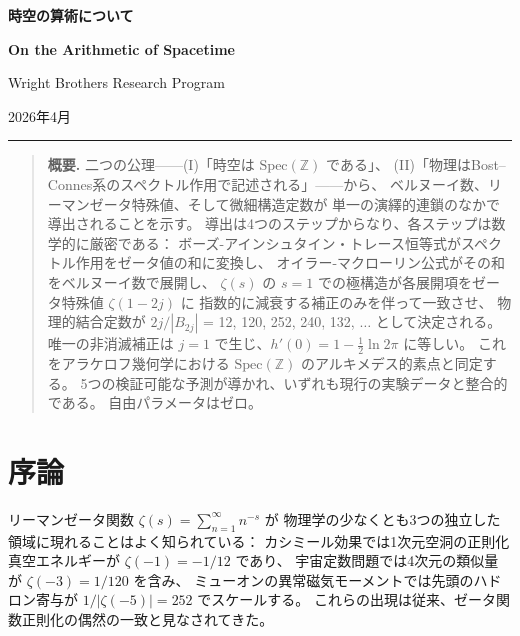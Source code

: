 \documentclass[11pt,a4paper]{article}
\newcommand{\Spec}{\mathrm{Spec}}
\begin{document}
\begin{center}
{\LARGE\bfseries 時空の算術について}

\bigskip

{\large\bfseries On the Arithmetic of Spacetime}

\bigskip

{\large Wright Brothers Research Program}

\medskip

2026年4月

\bigskip

\rule{12cm}{0.4pt}
\end{center}

\begin{quotation}
\noindent\textbf{概要.}\quad
二つの公理——(I)「時空は $\Spec(\mathbb{Z})$ である」、
(II)「物理はBost--Connes系のスペクトル作用で記述される」——から、
ベルヌーイ数、リーマンゼータ特殊値、そして微細構造定数が
単一の演繹的連鎖のなかで導出されることを示す。
導出は4つのステップからなり、各ステップは数学的に厳密である：
ボーズ-アインシュタイン・トレース恒等式がスペクトル作用をゼータ値の和に変換し、
オイラー-マクローリン公式がその和をベルヌーイ数で展開し、
$\zeta(s)$ の $s=1$ での極構造が各展開項をゼータ特殊値 $\zeta(1-2j)$ に
指数的に減衰する補正のみを伴って一致させ、
物理的結合定数が $2j/|B_{2j}|$ = 12, 120, 252, 240, 132, $\ldots$ として決定される。
唯一の非消滅補正は $j=1$ で生じ、$h'(0)=1-\frac{1}{2}\ln 2\pi$ に等しい。
これをアラケロフ幾何学における $\Spec(\mathbb{Z})$ のアルキメデス的素点と同定する。
5つの検証可能な予測が導かれ、いずれも現行の実験データと整合的である。
自由パラメータはゼロ。
\end{quotation}

\bigskip

\section{序論}

リーマンゼータ関数 $\zeta(s)=\sum_{n=1}^{\infty}n^{-s}$ が
物理学の少なくとも3つの独立した領域に現れることはよく知られている：
カシミール効果では1次元空洞の正則化真空エネルギーが
$\zeta(-1)=-1/12$ であり、
宇宙定数問題では4次元の類似量が $\zeta(-3)=1/120$ を含み、
ミューオンの異常磁気モーメントでは先頭のハドロン寄与が
$1/|\zeta(-5)|=252$ でスケールする。
これらの出現は従来、ゼータ関数正則化の偶然の一致と見なされてきた。
\end{document}
